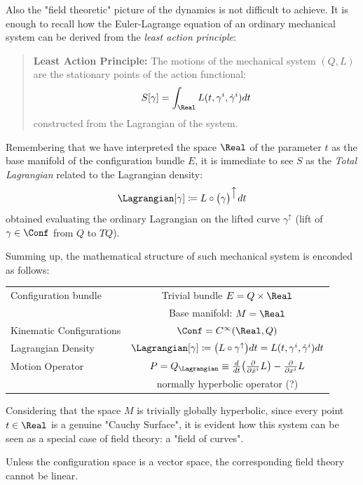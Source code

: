 \documentclass[Main]{subfiles}
\begin{document}
			Also the "field theoretic" picture of the dynamics is not difficult to achieve.
			It is enough to recall how the Euler-Lagrange equation of an ordinary mechanical system can be derived from the \emph{least action principle}:
			\begin{quotation}
				\textbf{Least Action Principle:}
				The %
				 motions of the mechanical system $(Q,L)$ are the stationary points of the action functional:
				\begin{displaymath}
					S [\gamma]= \int_\Real L(t,\gamma^i, \dot{\gamma}^i) dt
				\end{displaymath}
				constructed from the Lagrangian of the system.
			\end{quotation}
			Remembering that we have interpreted the space $\Real$ of the parameter $t$ as the base manifold of the configuration bundle $E$, it is immediate to see $S$ as the \emph{Total Lagrangian} related to the Lagrangian density:
			\begin{displaymath}
				\Lagrangian[\gamma] \coloneqq L \circ \big( \gamma \big)^{\big\uparrow} dt
			\end{displaymath}
			obtained evaluating the ordinary Lagrangian on the lifted curve $\gamma^\uparrow$ (lift of $\gamma\in \Conf$ from $Q$ to $TQ$).
		
		Summing up, the mathematical structure of such mechanical system is enconded as follows:
			\begin{center}\begin{tabular}{|l|c|}
			\hline
			Configuration bundle & Trivial bundle  $E= Q \times \Real$\\
													& Base manifold: $M=\Real$\\
			\hline
			Kinematic Configurations &  $\Conf=C^\infty(\Real,Q)$\\
			\hline
			Lagrangian Density		&	$\Lagrangian  [\gamma] \coloneqq \big( L \circ	\gamma^\uparrow \big) dt  = L(t,\gamma^i,\dot{\gamma}^i) dt$\\
			\hline
			Motion Operator			&  $P=Q_\Lagrangian \equiv \frac{d}{dt}\big(\frac{\partial}{\partial \dot{x}^i}L\big)-\frac{\partial}{\partial x^i}L $\\
													& normally hyperbolic operator (\danger ?)\\
			\hline
			\end{tabular}\end{center}
			
			Considering that the space $M$ is trivially globally hyperbolic, since every point $t\in\Real$ is a genuine "Cauchy Surface", it is evident how this system can be seen as a special case of field theory: a "field of curves".
			\begin{observation}
				Unless the configuration space is a vector space, the corresponding field theory cannot be linear.
			\end{observation}		
		
\end{document}
